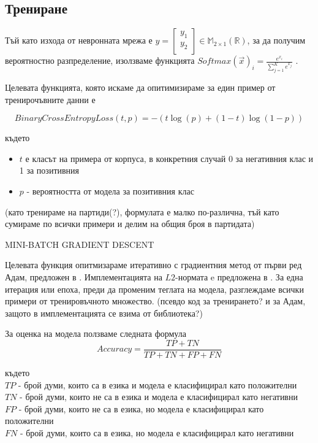 \documentclass[a4paper,12pt]{article}
\begin{document}
\subsection{Трениране}

Тъй като изхода от невронната мрежа е $y = \begin{bmatrix}
  y_1 \\ 
  y_2 \\ 
\end{bmatrix} \in \mathbb{M}_{2 \times 1} (\mathbb{R})$, за да получим вероятностно разпределение, изолзваме функцията ${Softmax(\vec{x})}_i = \frac{e^{x_i}}{\sum_{j=1}^{K}e^{x_j}}$ . 

Целевата функцията, която искаме да опитимизираме за един пример от тренирочъвните данни е

\begin{equation} \label{eqn}
BinaryCrossEntropyLoss(t, p) = -(t\log(p) + (1-t)\log(1-p))
\end{equation}

където

\begin{itemize}
 \item $t$ е класът на примера от корпуса, в конкретния случай 0 за негативния клас и 1 за позитивния
 \item $p$ - вероятността от модела за позитивния клас
\end{itemize}

(като тренираме на партиди(?), формулата е малко по-различна, тъй като сумираме по всички примери и делим на общия броя в партидата)

MINI-BATCH GRADIENT DESCENT

Целевата функция опитмизараме итеративно с градиентния метод от първи ред Адам, предложен в \cite{citation07}. Имплементацията на $L2$-нормата e предложена в \cite{citation08}. За една итерация или епоха, преди да променим теглата на модела, разглеждаме всички примери от тренировъчното множество. (псевдо код за тренирането? и за Адам, защото в имплементацията се взима от библиотека?)


За оценка на модела ползваме следната формула
\begin{equation} \label{eqn}
Accuracy = \frac{TP + TN}{TP + TN + FP + FN}
\end{equation}

където\\
$TP$ - брой думи, които са в езика и модела е класифицирал като положителни\\
$TN$ - брой думи, които не са в езика и модела е класифицирал като негативни\\
$FP$ - брой думи, които не са в езика, но модела е класифицирал като положителни\\
$FN$ - брой думи, които са в езика, но модела е класифицирал като негативни\\
\end{document}
